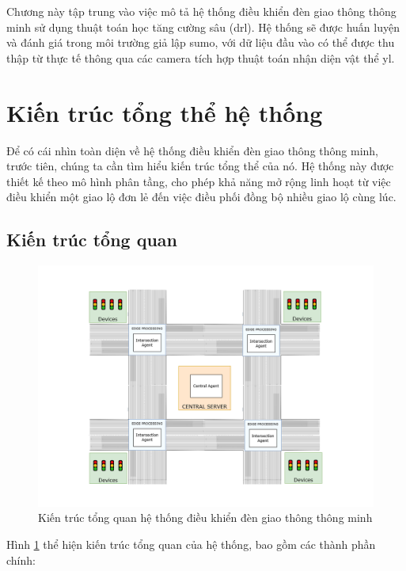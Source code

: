 Chương này tập trung vào việc mô tả hệ thống điều khiển đèn giao thông thông minh sử dụng thuật toán học tăng cường sâu (\ac{drl}). Hệ thống sẽ được huấn luyện và đánh giá trong môi trường giả lập \ac{sumo}, với dữ liệu đầu vào có thể được thu thập từ thực tế thông qua các camera tích hợp thuật toán nhận diện vật thể \ac{yl}.

\section{Kiến trúc tổng thể hệ thống}
Để có cái nhìn toàn diện về hệ thống điều khiển đèn giao thông thông minh, trước tiên, chúng ta cần tìm hiểu kiến trúc tổng thể của nó. Hệ thống này được thiết kế theo mô hình phân tầng, cho phép khả năng mở rộng linh hoạt từ việc điều khiển một giao lộ đơn lẻ đến việc điều phối đồng bộ nhiều giao lộ cùng lúc.

\subsection{Kiến trúc tổng quan}

\begin{figure}[!htp]
    \centering
    \includegraphics[width=\textwidth]{img/overview_architecture.png}
    \caption{Kiến trúc tổng quan hệ thống điều khiển đèn giao thông thông minh}
    \label{fig:overview_architecture}
\end{figure}

Hình \ref{fig:overview_architecture} thể hiện kiến trúc tổng quan của hệ thống,
bao gồm các thành phần chính:


